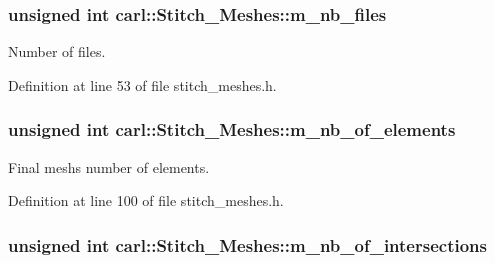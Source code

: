 \subsubsection[{m\+\_\+nb\+\_\+files}]{\setlength{\rightskip}{0pt plus 5cm}unsigned int carl\+::\+Stitch\+\_\+\+Meshes\+::m\+\_\+nb\+\_\+files\hspace{0.3cm}{\ttfamily [protected]}}\label{classcarl_1_1_stitch___meshes_a01c131c2e0c83ef1642326f6ea4f97d2}


Number of files. 



Definition at line 53 of file stitch\+\_\+meshes.\+h.

\hypertarget{classcarl_1_1_stitch___meshes_a4ed4ce7e9a185c3fd2bd92755888a37e}{}
\subsubsection[{m\+\_\+nb\+\_\+of\+\_\+elements}]{\setlength{\rightskip}{0pt plus 5cm}unsigned int carl\+::\+Stitch\+\_\+\+Meshes\+::m\+\_\+nb\+\_\+of\+\_\+elements\hspace{0.3cm}{\ttfamily [protected]}}\label{classcarl_1_1_stitch___meshes_a4ed4ce7e9a185c3fd2bd92755888a37e}


Final mesh\textquotesingle{}s number of elements. 



Definition at line 100 of file stitch\+\_\+meshes.\+h.

\hypertarget{classcarl_1_1_stitch___meshes_a764e63989a934f87105b5f978ec999f1}{}
\subsubsection[{m\+\_\+nb\+\_\+of\+\_\+intersections}]{\setlength{\rightskip}{0pt plus 5cm}unsigned int carl\+::\+Stitch\+\_\+\+Meshes\+::m\+\_\+nb\+\_\+of\+\_\+intersections\hspace{0.3cm}{\ttfamily [protected]}}\label{classcarl_1_1_stitch___meshes_a764e63989a934f87105b5f978ec999f1}


